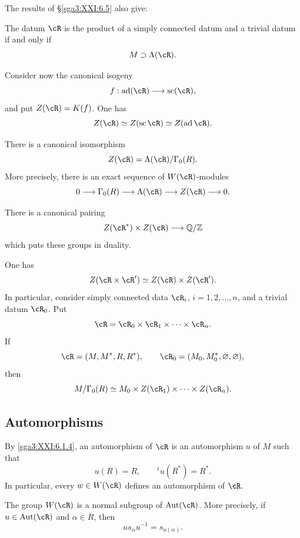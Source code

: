 The results of \S\ref{sga3:XXI:6.5} also give:

\begin{corollary}\label{sga3:XXI:6.6.9}
The datum \(\cR\) is the product of a simply connected datum and a
trivial datum if and only if
\[
 M\supset\Lambda(\cR).
\]
\end{corollary}

Consider now the canonical isogeny
\[
 f:\operatorname{ad}(\cR)\longrightarrow\operatorname{sc}(\cR),
\]
and put \(Z(\cR)=K(f)\). One has
\[
 Z(\cR)\simeq Z(\operatorname{sc}\cR)
 \simeq Z(\operatorname{ad}\cR).
\]

\begin{corollary}\label{sga3:XXI:6.6.10}
There is a canonical isomorphism
\[
 Z(\cR)=\Lambda(\cR)/\Gamma_0(R).
\]
More precisely, there is an exact sequence of
\(W(\cR)\)-modules
\[
 0\longrightarrow\Gamma_0(R)\longrightarrow\Lambda(\cR)
 \longrightarrow Z(\cR)\longrightarrow0.
\]
\end{corollary}

\begin{corollary}\label{sga3:XXI:6.6.11}
There is a canonical pairing
\[
 Z(\cR^\ast)\times Z(\cR)\longrightarrow\mathbb Q/\mathbb Z
\]
which puts these groups in duality.
\end{corollary}

\begin{remark}\label{sga3:XXI:6.6.12}
One has
\[
 Z(\cR\times\cR')\simeq Z(\cR)\times Z(\cR').
\]
In particular, consider simply connected data
\(\cR_i\), \(i=1,2,\ldots,n\), and a trivial datum \(\cR_0\).
Put
\[
 \cR=\cR_0\times\cR_1\times\cdots\times\cR_n.
\]
If
\[
 \cR=(M,M^\ast,R,R^\ast),
 \qquad
 \cR_0=(M_0,M_0^\ast,\varnothing,\varnothing),
\]
then
\[
 M/\Gamma_0(R)\simeq
 M_0\times Z(\cR_1)\times\cdots\times Z(\cR_n).
\]
\end{remark}

\subsection{Automorphisms}\label{sga3:XXI:6.7}

By \ref{sga3:XXI:6.1.4}, an automorphism of \(\cR\) is an
automorphism \(u\) of \(M\) such that
\[
 u(R)=R,
 \qquad
 {}^tu(R^\ast)=R^\ast.
\]
In particular, every \(w\in W(\cR)\) defines an automorphism of
\(\cR\).

\begin{lemma}\label{sga3:XXI:6.7.1}
The group \(W(\cR)\) is a normal subgroup of
\(\operatorname{Aut}(\cR)\). More precisely, if
\(u\in\operatorname{Aut}(\cR)\) and \(\alpha\in R\), then
\[
 us_\alpha u^{-1}=s_{u(\alpha)}.
\]
\end{lemma}


